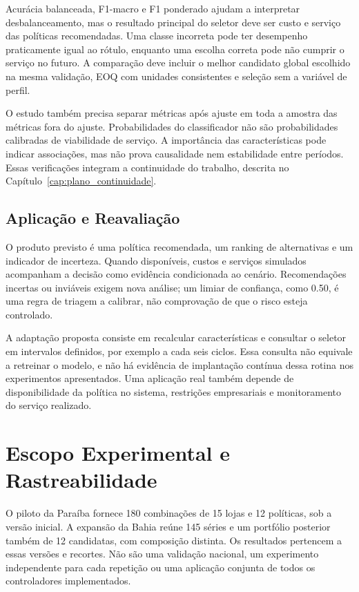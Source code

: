 Acurácia balanceada, F1-macro e F1 ponderado ajudam a interpretar desbalanceamento, mas o resultado principal do seletor deve ser custo e serviço das políticas recomendadas. Uma classe incorreta pode ter desempenho praticamente igual ao rótulo, enquanto uma escolha correta pode não cumprir o serviço no futuro. A comparação deve incluir o melhor candidato global escolhido na mesma validação, EOQ com unidades consistentes e seleção sem a variável de perfil.

O estudo também precisa separar métricas após ajuste em toda a amostra das métricas fora do ajuste. Probabilidades do classificador não são probabilidades calibradas de viabilidade de serviço. A importância das características pode indicar associações, mas não prova causalidade nem estabilidade entre períodos. Essas verificações integram a continuidade do trabalho, descrita no Capítulo~\ref{cap:plano_continuidade}.

\subsection{Aplicação e Reavaliação}
\label{sec:aplicacao_aipe}

O produto previsto é uma política recomendada, um ranking de alternativas e um indicador de incerteza. Quando disponíveis, custos e serviços simulados acompanham a decisão como evidência condicionada ao cenário. Recomendações incertas ou inviáveis exigem nova análise; um limiar de confiança, como 0.50, é uma regra de triagem a calibrar, não comprovação de que o risco esteja controlado.

A adaptação proposta consiste em recalcular características e consultar o seletor em intervalos definidos, por exemplo a cada seis ciclos. Essa consulta não equivale a retreinar o modelo, e não há evidência de implantação contínua dessa rotina nos experimentos apresentados. Uma aplicação real também depende de disponibilidade da política no sistema, restrições empresariais e monitoramento do serviço realizado.

\section{Escopo Experimental e Rastreabilidade}
\label{sec:protocolo_exp}
\label{sec:reporting}

O piloto da Paraíba fornece 180 combinações de 15 lojas e 12 políticas, sob a versão inicial. A expansão da Bahia reúne 145 séries e um portfólio posterior também de 12 candidatas, com composição distinta. Os resultados pertencem a essas versões e recortes. Não são uma validação nacional, um experimento independente para cada repetição ou uma aplicação conjunta de todos os controladores implementados.

